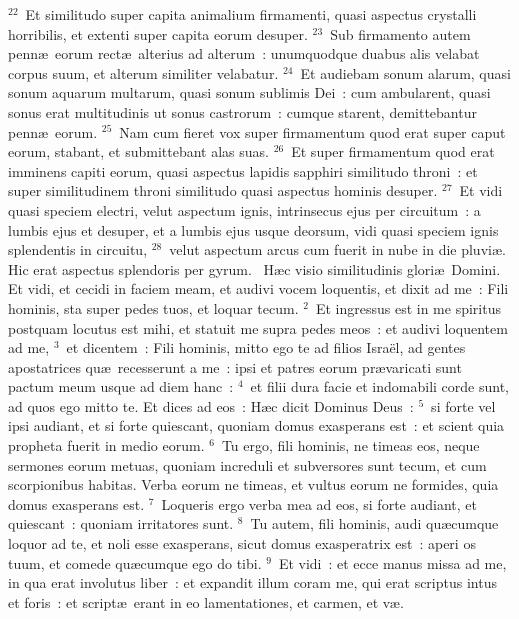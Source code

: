 ${}^{22}$~Et similitudo super capita animalium firmamenti, quasi aspectus crystalli horribilis, et extenti super capita eorum desuper.
${}^{23}$~Sub firmamento autem penn\ae\ eorum rect\ae\ alterius ad alterum~: unumquodque duabus alis velabat corpus suum, et alterum similiter velabatur.
${}^{24}$~Et audiebam sonum alarum, quasi sonum aquarum multarum, quasi sonum sublimis Dei~: cum ambularent, quasi sonus erat multitudinis ut sonus castrorum~: cumque starent, demittebantur penn\ae\ eorum.
${}^{25}$~Nam cum fieret vox super firmamentum quod erat super caput eorum, stabant, et submittebant alas suas.
${}^{26}$~Et super firmamentum quod erat imminens capiti eorum, quasi aspectus lapidis sapphiri similitudo throni~: et super similitudinem throni similitudo quasi aspectus hominis desuper.
${}^{27}$~Et vidi quasi speciem electri, velut aspectum ignis, intrinsecus ejus per circuitum~: a lumbis ejus et desuper, et a lumbis ejus usque deorsum, vidi quasi speciem ignis splendentis in circuitu,
${}^{28}$~velut aspectum arcus cum fuerit in nube in die pluvi\ae . Hic erat aspectus splendoris per gyrum.
~H\ae c visio similitudinis glori\ae\ Domini. Et vidi, et cecidi in faciem meam, et audivi vocem loquentis, et dixit ad me~: Fili hominis, sta super pedes tuos, et loquar tecum.
${}^{2}$~Et ingressus est in me spiritus postquam locutus est mihi, et statuit me supra pedes meos~: et audivi loquentem ad me,
${}^{3}$~et dicentem~: Fili hominis, mitto ego te ad filios Isra\"el, ad gentes apostatrices qu\ae\ recesserunt a me~: ipsi et patres eorum pr\ae varicati sunt pactum meum usque ad diem hanc~:
${}^{4}$~et filii dura facie et indomabili corde sunt, ad quos ego mitto te. Et dices ad eos~: H\ae c dicit Dominus Deus~:
${}^{5}$~si forte vel ipsi audiant, et si forte quiescant, quoniam domus exasperans est~: et scient quia propheta fuerit in medio eorum.
${}^{6}$~Tu ergo, fili hominis, ne timeas eos, neque sermones eorum metuas, quoniam increduli et subversores sunt tecum, et cum scorpionibus habitas. Verba eorum ne timeas, et vultus eorum ne formides, quia domus exasperans est.
${}^{7}$~Loqueris ergo verba mea ad eos, si forte audiant, et quiescant~: quoniam irritatores sunt.
${}^{8}$~Tu autem, fili hominis, audi qu\ae cumque loquor ad te, et noli esse exasperans, sicut domus exasperatrix est~: aperi os tuum, et comede qu\ae cumque ego do tibi.
${}^{9}$~Et vidi~: et ecce manus missa ad me, in qua erat involutus liber~: et expandit illum coram me, qui erat scriptus intus et foris~: et script\ae\ erant in eo lamentationes, et carmen, et v\ae .
